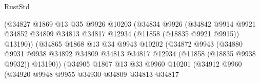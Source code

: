 \begin{lexlean}{RustStd}
\begin{coremodule}
                                      (@34827
                                        @1869
                                        @13
                                        @35
                                        @9926
                                        @10203
                                        (@34834
                                          @9926
                                          (@34842
                                            @9914
                                            @9921
                                            @34852
                                            @34809
                                            @34813
                                            @34817
                                            @12934
                                            (@11858 (@18835 @9921 @9915))
                                            @13190))
                                        (@34865
                                          @1868
                                          @13
                                          @34
                                          @9943
                                          @10202
                                          (@34872
                                            @9943
                                            (@34880
                                              @9931
                                              @9938
                                              @34892
                                              @34809
                                              @34813
                                              @34817
                                              @12934
                                              (@11858 (@18835 @9938 @9932))
                                              @13190))
                                          (@34905
                                            @1867
                                            @13
                                            @33
                                            @9960
                                            @10201
                                            (@34912
                                              @9960
                                              (@34920
                                                @9948
                                                @9955
                                                @34930
                                                @34809
                                                @34813
                                                @34817

\end{coremodule}
\end{lexlean}
